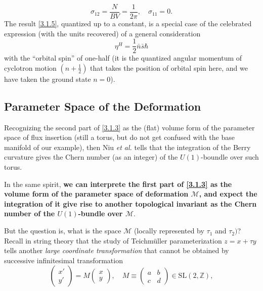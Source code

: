 \documentclass[10pt,nofootinbib,letterpaper]{revtex4}
\newcounter{Def}[section]
\begin{document}
		\begin{equation}\label{3.1.6}
			\sigma_{12}=\dfrac{N}{BV}=\dfrac{1}{2\pi},\quad\sigma_{11}=0.
		\end{equation}
		\indent The result \eqref{3.1.5}, quantized up to a constant, is a special case of the celebrated expression (with the units recovered) of a general consideration \cite{read2011hall}
		\begin{equation}\label{3.1.7}
			\eta^H=\dfrac{1}{2}\bar{n}\bar{s}\hbar
		\end{equation}
		with the ``orbital spin'' of one-half (it is the quantized angular momentum of cyclotron motion $(n+\frac12)$ that takes the position of orbital spin here, and we have taken the ground state $n=0$).

	\subsection{Parameter Space of the Deformation}
		Recognizing the second part of \eqref{3.1.3} as the (flat) volume form of the parameter space of flux insertion (still a torus, but do not get confused with the base manifold of our example), then Niu \textit{et al.} \cite{niu1985quantized} tells that the integration of the Berry curvature gives the Chern number (as an integer) of the $U(1)$-boundle over such torus.\par
		In the same spirit, \textbf{\color{red}we can interprete the first part of \eqref{3.1.3} as the volume form of the parameter space of deformation $\mathcal{M}$, and expect the integration of it give rise to another topological invariant as the Chern number of the $U(1)$-bundle over $\mathcal{M}$}.\par
		But the question is, what is the space $\mathcal{M}$ (locally represented by $\tau_1$ and $\tau_2)$? Recall in string theory that the study of Teichm\"{u}ller parameterization $z=x+\tau y$ tells another \emph{large coordinate transformation} that cannot be obtained by successive infinitesimal transformation
		\begin{equation*}
			\left(\begin{array}{c}
				x'\\y'
			\end{array}\right)=M\left(\begin{array}{c}
				x\\y
			\end{array}\right),\quad M\equiv\left(\begin{array}{cc}
				a&b\\c&d
			\end{array}\right)\in\mathrm{SL}(2,\mathbb{Z}),
		\end{equation*}
\end{document}
